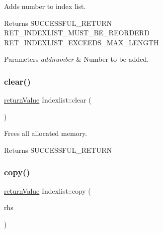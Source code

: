 Adds number to index list. \begin{DoxyReturn}{Returns}
S\+U\+C\+C\+E\+S\+S\+F\+U\+L\+\_\+\+R\+E\+T\+U\+RN ~\newline
 R\+E\+T\+\_\+\+I\+N\+D\+E\+X\+L\+I\+S\+T\+\_\+\+M\+U\+S\+T\+\_\+\+B\+E\+\_\+\+R\+E\+O\+R\+D\+E\+RD ~\newline
 R\+E\+T\+\_\+\+I\+N\+D\+E\+X\+L\+I\+S\+T\+\_\+\+E\+X\+C\+E\+E\+D\+S\+\_\+\+M\+A\+X\+\_\+\+L\+E\+N\+G\+TH 
\end{DoxyReturn}

\begin{DoxyParams}{Parameters}
{\em addnumber} & Number to be added. \\
\hline
\end{DoxyParams}
\mbox{\label{class_indexlist_a34e0b17923cc67a03f9aeb011261bb89}} 
\subsubsection{\texorpdfstring{clear()}{clear()}}
{\footnotesize\ttfamily \hyperlink{_message_handling_8hpp_a81d556f613bfbabd0b1f9488c0fa865e}{return\+Value} Indexlist\+::clear (\begin{DoxyParamCaption}{ }\end{DoxyParamCaption})\hspace{0.3cm}{\ttfamily [protected]}}

Frees all allocated memory. \begin{DoxyReturn}{Returns}
S\+U\+C\+C\+E\+S\+S\+F\+U\+L\+\_\+\+R\+E\+T\+U\+RN 
\end{DoxyReturn}
\mbox{\label{class_indexlist_a9ffa9399d56190092586fe3f366aab87}} 
\subsubsection{\texorpdfstring{copy()}{copy()}}
{\footnotesize\ttfamily \hyperlink{_message_handling_8hpp_a81d556f613bfbabd0b1f9488c0fa865e}{return\+Value} Indexlist\+::copy (\begin{DoxyParamCaption}\item[{const \hyperlink{class_indexlist}{Indexlist} \&}]{rhs }\end{DoxyParamCaption})\hspace{0.3cm}{\ttfamily [protected]}}

